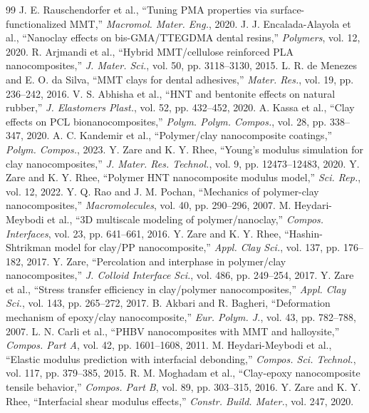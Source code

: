 \documentclass[conference]{IEEEtran}
\begin{document}
\begin{thebibliography}{99}
 J. E. Rauschendorfer et al., ``Tuning PMA properties via surface-functionalized MMT,'' \emph{Macromol. Mater. Eng.}, 2020.
 J. J. Encalada-Alayola et al., ``Nanoclay effects on bis-GMA/TTEGDMA dental resins,'' \emph{Polymers}, vol. 12, 2020.
 R. Arjmandi et al., ``Hybrid MMT/cellulose reinforced PLA nanocomposites,'' \emph{J. Mater. Sci.}, vol. 50, pp. 3118--3130, 2015.
 L. R. de Menezes and E. O. da Silva, ``MMT clays for dental adhesives,'' \emph{Mater. Res.}, vol. 19, pp. 236--242, 2016.
 V. S. Abhisha et al., ``HNT and bentonite effects on natural rubber,'' \emph{J. Elastomers Plast.}, vol. 52, pp. 432--452, 2020.
 A. Kassa et al., ``Clay effects on PCL bionanocomposites,'' \emph{Polym. Polym. Compos.}, vol. 28, pp. 338--347, 2020.
 A. C. Kandemir et al., ``Polymer/clay nanocomposite coatings,'' \emph{Polym. Compos.}, 2023.
 Y. Zare and K. Y. Rhee, ``Young's modulus simulation for clay nanocomposites,'' \emph{J. Mater. Res. Technol.}, vol. 9, pp. 12473--12483, 2020.
 Y. Zare and K. Y. Rhee, ``Polymer HNT nanocomposite modulus model,'' \emph{Sci. Rep.}, vol. 12, 2022.
 Y. Q. Rao and J. M. Pochan, ``Mechanics of polymer-clay nanocomposites,'' \emph{Macromolecules}, vol. 40, pp. 290--296, 2007.
 M. Heydari-Meybodi et al., ``3D multiscale modeling of polymer/nanoclay,'' \emph{Compos. Interfaces}, vol. 23, pp. 641--661, 2016.
 Y. Zare and K. Y. Rhee, ``Hashin-Shtrikman model for clay/PP nanocomposite,'' \emph{Appl. Clay Sci.}, vol. 137, pp. 176--182, 2017.
 Y. Zare, ``Percolation and interphase in polymer/clay nanocomposites,'' \emph{J. Colloid Interface Sci.}, vol. 486, pp. 249--254, 2017.
 Y. Zare et al., ``Stress transfer efficiency in clay/polymer nanocomposites,'' \emph{Appl. Clay Sci.}, vol. 143, pp. 265--272, 2017.
 B. Akbari and R. Bagheri, ``Deformation mechanism of epoxy/clay nanocomposite,'' \emph{Eur. Polym. J.}, vol. 43, pp. 782--788, 2007.
 L. N. Carli et al., ``PHBV nanocomposites with MMT and halloysite,'' \emph{Compos. Part A}, vol. 42, pp. 1601--1608, 2011.
 M. Heydari-Meybodi et al., ``Elastic modulus prediction with interfacial debonding,'' \emph{Compos. Sci. Technol.}, vol. 117, pp. 379--385, 2015.
 R. M. Moghadam et al., ``Clay-epoxy nanocomposite tensile behavior,'' \emph{Compos. Part B}, vol. 89, pp. 303--315, 2016.
 Y. Zare and K. Y. Rhee, ``Interfacial shear modulus effects,'' \emph{Constr. Build. Mater.}, vol. 247, 2020.

\end{thebibliography}
\end{document}
